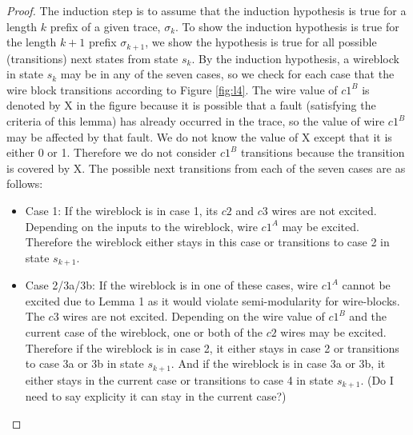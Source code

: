 \documentclass[12pt]{report}
\begin{document}
\begin{proof}
The induction step is to assume that the induction hypothesis is true for a length $k$ prefix of a given trace, $\sigma_k$.  
To show the induction hypothesis is true for the length $k+1$ prefix $\sigma_{k+1}$, we show the hypothesis is true for all possible (transitions) next states from state $s_k$.  
By the induction hypothesis, a wireblock in state $s_k$ may be in any of the seven cases, so we check for each case that the wire block transitions according to Figure \ref{fig:l4}.  
The wire value of $c1^B$ is denoted by X in the figure because it is possible that a fault (satisfying the criteria of this lemma) has already occurred in the trace, so the value of wire $c1^B$ may be affected by that fault.  We do not know the value of X except that it is either 0 or 1.  
Therefore we do not consider $c1^B$ transitions because the transition is covered by X. %
  The possible next transitions from each of the seven cases are as follows:
\begin{itemize}
	\item
Case 1:  If the wireblock is in case 1, its $c2$ and $c3$ wires are not excited.  Depending on the inputs to the wireblock, wire $c1^A$ may be excited.  Therefore the wireblock either stays in this case or transitions to case 2 in state $s_{k+1}$.  %
\item
Case 2/3a/3b:   If the wireblock is in one of these cases, wire $c1^A$ cannot be excited due to Lemma 1 as it would violate semi-modularity for wire-blocks.  The $c3$ wires are not excited.  Depending on the wire value of $c1^B$ and the current case of the wireblock, one or both of the $c2$ wires may be excited.   
Therefore if the wireblock is in case 2, it either stays in case 2 or transitions to case 3a or 3b in state $s_{k+1}$.  And if the wireblock is in case 3a or 3b, it either stays in the current case or transitions to case 4 in state $s_{k+1}$.  (Do I need to say explicity it can stay in the current case?)

\end{itemize}
\end{proof}
\end{document}
